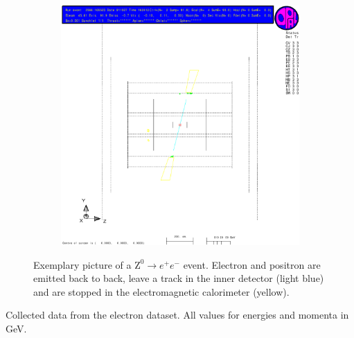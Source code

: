 \documentclass[11pt, a4paper]{article}
\numberwithin{equation}{section}
\begin{document}
\begin{figure}[h]
\ContinuedFloat
	\begin{subfigure}{\textwidth}
		\centering
		\includegraphics[width=.9\textwidth]{./data/tag1/ee_pics/cropped/ee_02_side}
	\end{subfigure}
	\caption{Exemplary picture of a $\mathrm{Z}^0\rightarrow e^+e^-$ event. Electron and positron are emitted back to back, leave a track in the inner detector (light blue) and are stopped in the electromagnetic calorimeter (yellow).}
	\label{fig:eventdisplay_ee}
\end{figure}
\begin{table}
	\centering
	
	\caption{Collected data from the electron dataset. All values for energies and momenta in \si{GeV}.}
	\label{tab:eventdisplay_ee}
\end{table}
\clearpage
\end{document}
